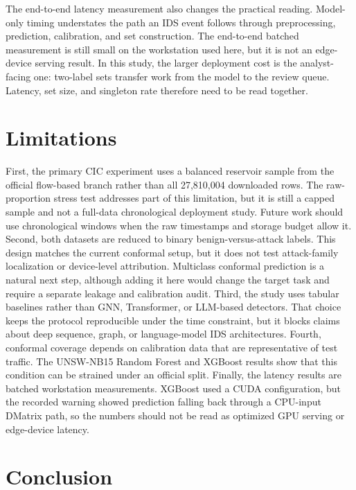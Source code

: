 \documentclass[11pt]{article}
\begin{document}
The end-to-end latency measurement also changes the practical reading. Model-only timing understates the path an IDS event follows through preprocessing, prediction, calibration, and set construction. The end-to-end batched measurement is still small on the workstation used here, but it is not an edge-device serving result. In this study, the larger deployment cost is the analyst-facing one: two-label sets transfer work from the model to the review queue. Latency, set size, and singleton rate therefore need to be read together.

\section{Limitations}

First, the primary CIC experiment uses a balanced reservoir sample from the official flow-based branch rather than all 27,810,004 downloaded rows. The raw-proportion stress test addresses part of this limitation, but it is still a capped sample and not a full-data chronological deployment study. Future work should use chronological windows when the raw timestamps and storage budget allow it. Second, both datasets are reduced to binary benign-versus-attack labels. This design matches the current conformal setup, but it does not test attack-family localization or device-level attribution. Multiclass conformal prediction is a natural next step, although adding it here would change the target task and require a separate leakage and calibration audit. Third, the study uses tabular baselines rather than GNN, Transformer, or LLM-based detectors. That choice keeps the protocol reproducible under the time constraint, but it blocks claims about deep sequence, graph, or language-model IDS architectures. Fourth, conformal coverage depends on calibration data that are representative of test traffic. The UNSW-NB15 Random Forest and XGBoost results show that this condition can be strained under an official split. Finally, the latency results are batched workstation measurements. XGBoost used a CUDA configuration, but the recorded warning showed prediction falling back through a CPU-input DMatrix path, so the numbers should not be read as optimized GPU serving or edge-device latency.

\section{Conclusion}
\end{document}

